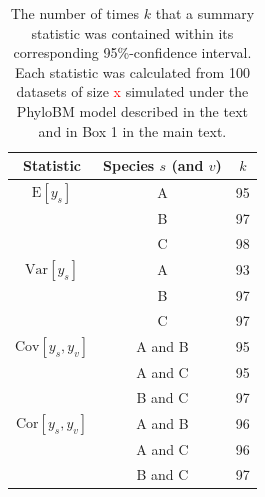 \documentclass[oneside]{article}
\begin{document}
\begin{table}[h]
  \caption{The number of times $k$ that a summary
    statistic was contained within its corresponding
    95\%-confidence interval.
    Each statistic was calculated from 100 datasets of size
    \textcolor{red}{x} simulated
    under the PhyloBM model described in the text and in Box 1
    in the main text.}
  \label{suptab:bmsimcis}
  \centering
  \begin{tabular}{ c|c|c }
    \hline
    Statistic & Species $s$ (and $v$)& $k$\\
    \hline  
    $\text{E}[y_s]$ & A & 95\\
              & B & 97\\
              & C & 98\\
    $\text{Var}[y_s]$ & A & 93\\
              & B & 97\\
              & C & 97\\
    $\text{Cov}[y_s,y_v]$ & A and B & 95\\
              & A and C & 95\\
              & B and C & 97\\
    $\text{Cor}[y_s,y_v]$ & A and B & 96\\
              & A and C & 96\\
              & B and C & 97\\
    \hline
  \end{tabular}
\end{table}



\end{document}
